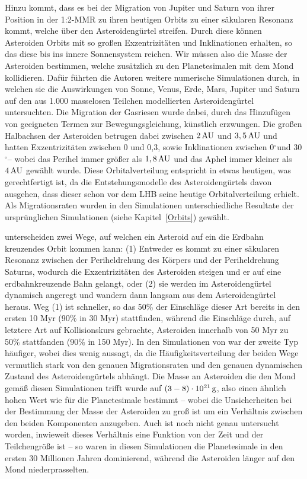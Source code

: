 \documentclass[12pt,a4paper,twoside]{article}
\renewcommand{\cite}{\citep}
\newcommand{\refsec}[1]{siehe Kapitel~\ref{#1}}
\newcommand{\degree}{$^\circ$}
\begin{document}
Hinzu kommt, dass es bei der Migration von Jupiter und Saturn von ihrer Position in der 1:2-MMR zu ihren heutigen Orbits zu einer säkularen Resonanz kommt, welche über den Asteroidengürtel streifen.
Durch diese können Asteroiden Orbits mit so großen Exzentrizitäten und Inklinationen erhalten, so das diese bis ins innere Sonnensystem reichen. Wir müssen also die Masse der Asteroiden bestimmen, welche zusätzlich zu den Planetesimalen mit dem Mond kollidieren.
Dafür führten die Autoren weitere numerische Simulationen durch, in welchen sie die Auswirkungen von Sonne, Venus, Erde, Mars, Jupiter und Saturn auf den aus 1.000 masselosen Teilchen modellierten Asteroidengürtel untersuchten.
Die Migration der Gasriesen wurde dabei, durch das Hinzufügen von geeigneten Termen zur Bewegungsgleichung, künstlich erzwungen.
Die großen Halbachsen der Asteroiden betrugen dabei zwischen $\unit[2]{AU}$ und $\unit[3,5]{AU}$ und hatten Exzentrizitäten zwischen 0 und 0,3, sowie Inklinationen zwischen 0\degree und 30\degree – wobei das Perihel immer größer als $\unit[1,8]{AU}$ und das Aphel immer kleiner als $\unit[4]{AU}$ gewählt wurde.
Diese Orbitalverteilung entspricht in etwas heutigen, was gerechtfertigt ist, da die Entstehungsmodelle des Asteroidengürtels davon ausgehen, dass dieser schon vor dem LHB seine heutige Orbitalverteilung erhielt\cite{Wetherill1992,Petit2001,Gomes2005}.
Als Migrationsraten wurden in den Simulationen unterschiedliche Resultate der ursprünglichen Simulationen (\refsec{Orbits}) gewählt.

\cite{Gomes2005} unterscheiden zwei Wege, auf welchen ein Asteroid auf ein die Erdbahn kreuzendes Orbit kommen kann: (1) Entweder es kommt zu einer säkularen Resonanz zwischen der Periheldrehung des Körpers und der Periheldrehung Saturns, wodurch die Exzentrizitäten des Asteroiden steigen und er auf eine erdbahnkreuzende Bahn gelangt, oder (2) sie werden im Asteroidengürtel dynamisch angeregt und wandern dann langsam aus dem Asteroidengürtel heraus.
Weg (1) ist schneller, so das 50\% der Einschläge dieser Art bereits in den ersten 10 Myr (90\% in 30 Myr) stattfinden, während die Einschläge durch, auf letztere Art auf Kollisionskurs gebrachte, Asteroiden innerhalb von 50 Myr zu 50\% stattfanden (90\% in 150 Myr)\cite{Gomes2005}.
In den Simulationen von \cite{Gomes2005} war der zweite Typ häufiger, wobei dies wenig aussagt, da
die Häufigkeitsverteilung der beiden Wege vermutlich stark von den genauen Migrationsraten und den genauen dynamischen Zustand des Asteroidengürtels abhängt.
Die Masse an Asteroiden die den Mond gemäß diesen Simulationen trifft wurde auf $\unit[\left( 3-8 \right) \cdot 10^{21}]{g}$, %
also einen ähnlich hohen Wert wie für die Planetesimale bestimmt – wobei die Unsicherheiten bei der Bestimmung der Masse der Asteroiden zu groß ist um ein Verhältnis zwischen den beiden Komponenten anzugeben. Auch ist noch nicht genau untersucht worden, inwieweit dieses Verhältnis eine Funktion von der Zeit und der Teilchengröße ist – so waren in diesen Simulationen die Planetesimale in den ersten 30 Millionen Jahren dominierend, während die Asteroiden länger auf den Mond niederprasselten\cite{Gomes2005}.
\end{document}
